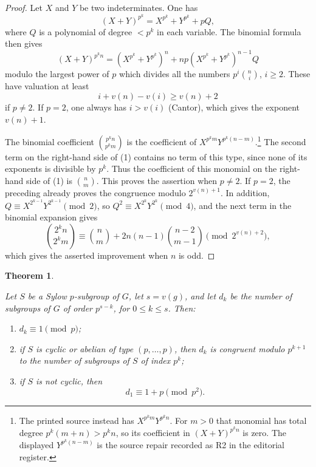 \documentclass[12pt,reqno]{amsart}
\theoremstyle{plain}
\newtheorem*{theorem}{Theorem}
\begin{document}
\begin{proof}
Let $X$ and $Y$ be two indeterminates. One has
\[
(X+Y)^{p^k}=X^{p^k}+Y^{p^k}+pQ,
\]
where $Q$ is a polynomial of degree $<p^k$ in each variable. The binomial formula then gives
\begin{equation}
(X+Y)^{p^k n}=(X^{p^k}+Y^{p^k})^n+np(X^{p^k}+Y^{p^k})^{n-1}Q
\end{equation}
modulo the largest power of $p$ which divides all the numbers $p^i\binom{n}{i}$, $i\geq 2$. These have valuation at least
\[
i+v(n)-v(i)\geq v(n)+2
\]
if $p\neq 2$. If $p=2$, one always has $i>v(i)$ (Cantor), which gives the exponent $v(n)+1$.

\enlargethispage{4pt}
The binomial coefficient $\binom{p^k n}{p^k m}$ is the coefficient of
$X^{p^k m}Y^{p^k(n-m)}$.\footnote{The printed source instead has
$X^{p^k m}Y^{p^k n}$.  For $m>0$ that monomial has total degree
$p^k(m+n)>p^kn$, so its coefficient in $(X+Y)^{p^kn}$ is zero.  The
displayed $Y^{p^k(n-m)}$ is the source repair recorded as R2 in the
editorial register.} The second term on the right-hand side of (1)
contains no term of this type, since none of its exponents is divisible
by $p^k$. Thus the coefficient of this monomial on the right-hand side
of (1) is $\binom{n}{m}$. This proves the assertion when $p\neq 2$.
If $p=2$, the preceding already proves the congruence modulo
$2^{v(n)+1}$. In addition,
$Q\equiv X^{2^{k-1}}Y^{2^{k-1}}\pmod 2$, so
$Q^2\equiv X^{2^k}Y^{2^k}\pmod 4$, and the next term in the binomial
expansion gives
\[
\binom{2^k n}{2^k m}\equiv \binom{n}{m}+2n(n-1)\binom{n-2}{m-1}\pmod {2^{v(n)+2}},
\]
which gives the asserted improvement when $n$ is odd.
\end{proof}

\begin{theorem}\ \par
Let $S$ be a Sylow $p$-subgroup of $G$, let $s=v(g)$, and let $d_k$ be the number of subgroups of $G$ of order $p^{s-k}$, for $0\leq k\leq s$. Then:
\begin{enumerate}
\item[(i)] $d_k\equiv 1\pmod p$;
\item[(ii)] if $S$ is cyclic or abelian of type $(p,\ldots,p)$, then $d_k$ is congruent modulo $p^{k+1}$ to the number of subgroups of $S$ of index $p^k$;
\item[(iii)] if $S$ is not cyclic, then
\[
d_1\equiv 1+p\pmod {p^2}.
\]
\end{enumerate}
\end{theorem}
\end{document}
